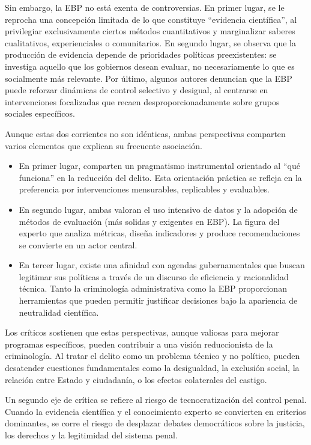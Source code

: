 \documentclass[
  spanish,
  letterpaper,
  DIV=11,
  numbers=noendperiod]{scrreprt}
\begin{document}
Sin embargo, la EBP no está exenta de controversias. En primer lugar, se
le reprocha una concepción limitada de lo que constituye ``evidencia
científica'', al privilegiar exclusivamente ciertos métodos
cuantitativos y marginalizar saberes cualitativos, experienciales o
comunitarios. En segundo lugar, se observa que la producción de
evidencia depende de prioridades políticas preexistentes: se investiga
aquello que los gobiernos desean evaluar, no necesariamente lo que es
socialmente más relevante. Por último, algunos autores denuncian que la
EBP puede reforzar dinámicas de control selectivo y desigual, al
centrarse en intervenciones focalizadas que recaen desproporcionadamente
sobre grupos sociales específicos.

Aunque estas dos corrientes no son idénticas, ambas perspectivas
comparten varios elementos que explican su frecuente asociación.

\begin{itemize}
\item
  En primer lugar, comparten un pragmatismo instrumental orientado al
  ``qué funciona'' en la reducción del delito. Esta orientación práctica
  se refleja en la preferencia por intervenciones mensurables,
  replicables y evaluables.
\item
  En segundo lugar, ambas valoran el uso intensivo de datos y la
  adopción de métodos de evaluación (más solidas y exigentes en EBP). La
  figura del experto que analiza métricas, diseña indicadores y produce
  recomendaciones se convierte en un actor central.
\item
  En tercer lugar, existe una afinidad con agendas gubernamentales que
  buscan legitimar sus políticas a través de un discurso de eficiencia y
  racionalidad técnica. Tanto la criminología administrativa como la EBP
  proporcionan herramientas que pueden permitir justificar decisiones
  bajo la apariencia de neutralidad científica.
\end{itemize}

Los críticos sostienen que estas perspectivas, aunque valiosas para
mejorar programas específicos, pueden contribuir a una visión
reduccionista de la criminología. Al tratar el delito como un problema
técnico y no político, pueden desatender cuestiones fundamentales como
la desigualdad, la exclusión social, la relación entre Estado y
ciudadanía, o los efectos colaterales del castigo.

Un segundo eje de crítica se refiere al riesgo de tecnocratización del
control penal. Cuando la evidencia científica y el conocimiento experto
se convierten en criterios dominantes, se corre el riesgo de desplazar
debates democráticos sobre la justicia, los derechos y la legitimidad
del sistema penal.
\end{document}
